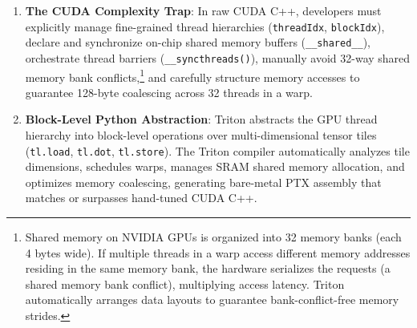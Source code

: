 \documentclass[
  letterpaper,
]{scrbook}
\providecommand{\tightlist}{%
  \setlength{\itemsep}{0pt}\setlength{\parskip}{0pt}}
\begin{document}
\begin{enumerate}
\def\labelenumi{\arabic{enumi}.}
\tightlist
\item
  \textbf{The CUDA Complexity Trap}: In raw CUDA C++, developers must
  explicitly manage fine-grained thread hierarchies (\texttt{threadIdx},
  \texttt{blockIdx}), declare and synchronize on-chip shared memory
  buffers (\texttt{\_\_shared\_\_}), orchestrate thread barriers
  (\texttt{\_\_syncthreads()}), manually avoid 32-way shared memory bank
  conflicts,\footnote{Shared memory on NVIDIA GPUs is organized into 32
    memory banks (each 4 bytes wide). If multiple threads in a warp
    access different memory addresses residing in the same memory bank,
    the hardware serializes the requests (a shared memory bank
    conflict), multiplying access latency. Triton automatically arranges
    data layouts to guarantee bank-conflict-free memory strides.} and
  carefully structure memory accesses to guarantee 128-byte coalescing
  across 32 threads in a warp.
\item
  \textbf{Block-Level Python Abstraction}: Triton abstracts the GPU
  thread hierarchy into block-level operations over multi-dimensional
  tensor tiles (\texttt{tl.load}, \texttt{tl.dot}, \texttt{tl.store}).
  The Triton compiler automatically analyzes tile dimensions, schedules
  warps, manages SRAM shared memory allocation, and optimizes memory
  coalescing, generating bare-metal PTX assembly that matches or
  surpasses hand-tuned CUDA C++.
\end{enumerate}
\end{document}
